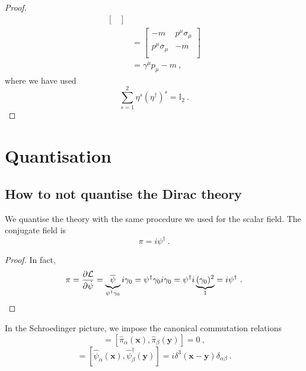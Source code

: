 \begin{proof}
\begin{equation*}
\begin{aligned}
\begin{bmatrix}
            \end{bmatrix} \\ & = \begin{bmatrix}
                - m & p^\mu \sigma_\mu \\ p^\mu \overline \sigma_\mu & - m \\
            \end{bmatrix} \\ & = \gamma^\mu p_\mu - m ~,
        \end{aligned}
        \end{equation*}
        where we have used 
        \begin{equation*}
            \sum_{s=1}^{2} \eta^s (\eta^\dagger)^s = \mathbb I_2 ~.
        \end{equation*}
    \end{proof}

\chapter{Quantisation}

\section{How to not quantise the Dirac theory}

    We quantise the theory with the same procedure we used for the scalar field. The conjugate field is 
    \begin{equation*}
        \pi = i \psi^\dagger ~.
    \end{equation*}

    \begin{proof}
        In fact, 
        \begin{equation*}
            \pi = \frac{\partial\mathcal L}{\partial\dot \psi} = \underbrace{\overline \psi}_{\psi^\dagger \gamma_0} i \gamma_0 = \psi^\dagger \gamma_0 i \gamma_0 = \psi^\dagger i \underbrace{(\gamma_0)^2}_{1} = i \psi^\dagger ~.
        \end{equation*}
    \end{proof}

    In the Schroedinger picture, we impose the canonical commutation relations
    \begin{equation*}
        [\hat \psi_\alpha (\mathbf x), \hat \psi_\beta (\mathbf y)] = [\hat \pi_\alpha (\mathbf x), \hat \pi_\beta (\mathbf y)] = 0 ~,
    \end{equation*}
    \begin{equation*}
        [\hat \psi_\alpha (\mathbf x), \hat \pi_\beta (\mathbf y)] = [\hat \psi_\alpha (\mathbf x), \hat \psi^\dagger_\beta (\mathbf y)] = i \delta^3 (\mathbf x - \mathbf y) \delta_{\alpha\beta} ~.
    \end{equation*}


